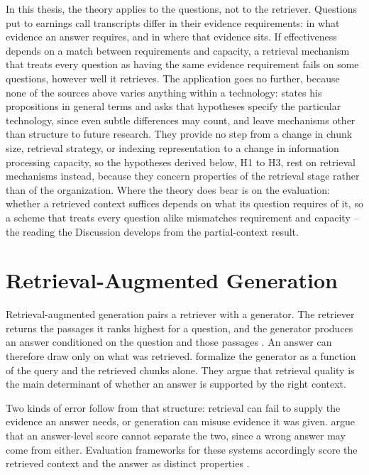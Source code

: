 In this thesis, the theory applies to the questions, not to the retriever.
Questions put to earnings call transcripts differ in their evidence
requirements: in what evidence an answer requires, and in where that evidence
sits. If effectiveness depends on a match between requirements and capacity, a
retrieval mechanism that treats every question as having the same evidence
requirement fails on some questions, however well it retrieves. The application
goes no further, because none of the sources above varies anything within a
technology: \textcite[67]{huber1990} states his propositions in general terms
and asks that hypotheses specify the particular technology, since even subtle
differences may count, and \textcite[622]{tushman1978} leave mechanisms other
than structure to future research. They provide no step from a change in chunk
size, retrieval strategy, or indexing representation to a change in information
processing capacity, so the hypotheses derived below, H1 to H3, rest on
retrieval mechanisms instead, because they concern properties of the retrieval
stage rather than of the organization. Where the theory does bear is on the
evaluation: whether a retrieved context suffices depends on what its question
requires of it, so a scheme that treats every question alike mismatches
requirement and capacity -- the reading the Discussion develops from the
partial-context result.

\section{Retrieval-Augmented Generation}

Retrieval-augmented generation pairs a retriever with a generator. The retriever
returns the passages it ranks highest for a question, and the generator produces
an answer conditioned on the question and those passages \parencite{lewis2020}.
An answer can therefore draw only on what was retrieved.
\textcite[1, 4]{kobeissi2026} formalize the generator as a function of the query
and the retrieved chunks alone. They argue that retrieval quality is the main
determinant of whether an answer is supported by the right context.

Two kinds of error follow from that structure: retrieval can fail to supply the
evidence an answer needs, or generation can misuse evidence it was given.
\textcite{kobeissi2026} argue that an answer-level score cannot separate the two,
since a wrong answer may come from either. Evaluation frameworks for these
systems accordingly score the retrieved context and the answer as distinct
properties \parencite{es2024,saad-falcon2024}.

